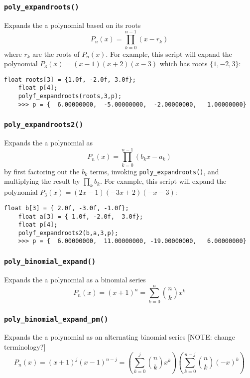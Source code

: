 \subsubsection{{\tt poly\_expandroots()}}
\label{module:math:poly:polyf_expandroots}
Expands the a polynomial based on its roots
\[
    P_n(x) = \prod_{k=0}^{n-1}{(x - r_k)}
\]
where $r_k$ are the roots of $P_n(x)$.
For example, this script will expand the polynomial
$P_3(x) = (x-1)(x+2)(x-3)$ which has roots
$\{1,-2,3\}$:
%
\begin{Verbatim}[fontsize=\small]
    float roots[3] = {1.0f, -2.0f, 3.0f};
    float p[4];
    polyf_expandroots(roots,3,p);
    >>> p = {  6.00000000,  -5.00000000,  -2.00000000,   1.00000000}
\end{Verbatim}
%

\subsubsection{{\tt poly\_expandroots2()}}
\label{module:math:poly:polyf_expandroots2}
Expands the a polynomial as
\[
    P_n(x) = \prod_{k=0}^{n-1}{(b_kx-a_k)}
\]
by first factoring out the $b_k$ terms,
invoking {\tt poly\_expandroots()}, and
multiplying the result by $\prod_k{b_k}$.
For example, this script will expand the polynomial
$P_3(x) = (2x-1)(-3x+2)(-x-3)$:
%
\begin{Verbatim}[fontsize=\small]
    float b[3] = { 2.0f, -3.0f, -1.0f};
    float a[3] = { 1.0f, -2.0f,  3.0f};
    float p[4];
    polyf_expandroots2(b,a,3,p);
    >>> p = {  6.00000000,  11.00000000, -19.00000000,   6.00000000}
\end{Verbatim}
%

\subsubsection{{\tt poly\_binomial\_expand()}}
\label{module:math:poly:polyf_binomial_expand}
Expands the a polynomial as a binomial series
\[
    P_n(x) = (x+1)^n = \sum_{k=0}^{n}{ {n \choose k} x^k}
\]

\subsubsection{{\tt poly\_binomial\_expand\_pm()}}
\label{module:math:poly:polyf_binomial_expand_pm}
Expands the a polynomial as an alternating binomial series
[NOTE: change terminology?]
\[
    P_n(x) = (x+1)^j (x-1)^{n-j}
           = \left( \sum_{k=0}^{j}  { {n \choose k}    x^k} \right)
             \left( \sum_{k=0}^{n-j}{ {n \choose k} (-x)^k} \right)
\]


